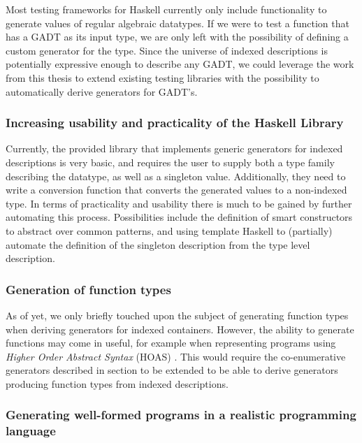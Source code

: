 \documentclass[a4paper,msc,twosized=semi]{uustthesis}
\let\oldemph\emph
\renewcommand\emph[1]{{\large\oldemph{#1}}}
\begin{document}
  Most testing frameworks for Haskell currently only include functionality to generate 
  values of regular algebraic datatypes. If we were to test a function that has a GADT 
  as its input type, we are only left with the possibility of defining a custom 
  generator for the type. Since the universe of indexed descriptions is potentially 
  expressive enough to describe any GADT, we could leverage the work from this thesis 
  to extend existing testing libraries with the possibility to automatically derive 
  generators for GADT's. 

\subsubsection{Increasing usability and practicality of the Haskell Library}

  Currently, the provided library that implements generic generators for indexed 
  descriptions is very basic, and requires the user to supply both a type family 
  describing the datatype, as well as a singleton value. Additionally, they need to 
  write a conversion function that converts the generated values to a non-indexed 
  type. In terms of practicality and usability there is much to be gained by further 
  automating this process. Possibilities include the definition of smart constructors 
  to abstract over common patterns, and using template Haskell \cite
  {sheard2002template} to (partially) automate the definition of the singleton 
  description from the type level description. 

\subsubsection{Generation of function types}

  As of yet, we only briefly touched upon the subject of generating function types 
  when deriving generators for indexed containers. However, the ability to generate 
  functions may come in useful, for example when representing programs using \emph
  {Higher Order Abstract Syntax} (HOAS) \cite{pfenning1988higher}. This would require 
  the co-enumerative generators described in section to be extended to be able 
  to derive generators producing function types from indexed descriptions. 

\subsubsection{Generating well-formed programs in a realistic programming language}
\end{document}
